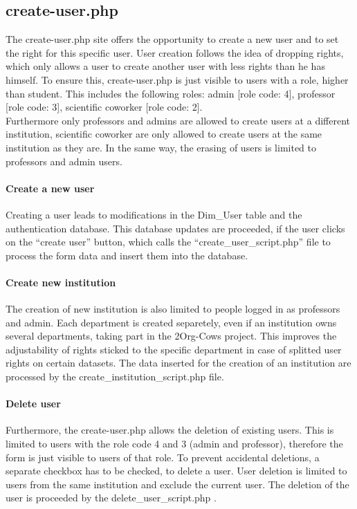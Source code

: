 
\label{create-user.php}
\subsection{create-user.php}
The create-user.php site offers the opportunity to create a new user and to set the right for this specific user. User creation follows the idea of dropping rights, 
which only allows a user to create another user with less rights than he has himself. To ensure this, create-user.php is just visible to users with a role, higher than student.
This includes the following roles: admin [role code: 4], professor [role code: 3], scientific coworker [role code: 2]. \\
Furthermore only professors and admins are allowed to create users at a different institution, scientific coworker are only allowed to create users at the 
same institution as they are. In the same way, the erasing of users is limited to professors and admin users.
\paragraph{Create a new user}
Creating a user leads to modifications in the Dim\_User table and the authentication database. This database updates are proceeded, if the user clicks on 
the ``create user'' button, which calls the ``create\_user\_script.php'' file to process the form data and insert them into the database.
\paragraph{Create new institution}
The creation of new institution is also limited to people logged in as professors and admin. Each department is created separetely, even if an institution owns several departments, 
taking part in the 2Org-Cows project. This improves the adjustability of rights sticked to the specific department in case of splitted user rights on certain datasets.
The data inserted for the creation of an institution are processed by the create\_institution\_script.php file.
\paragraph{Delete user}
Furthermore, the create-user.php allows the deletion of existing users. This is limited to users with the role code 4 and 3 (admin and professor), therefore the form is just visible 
to users of that role. To prevent accidental deletions, a separate checkbox has to be checked, to delete a user. User deletion is limited to users from the same institution and exclude 
the current user. The deletion of the user is proceeded by the delete\_user\_script.php .
